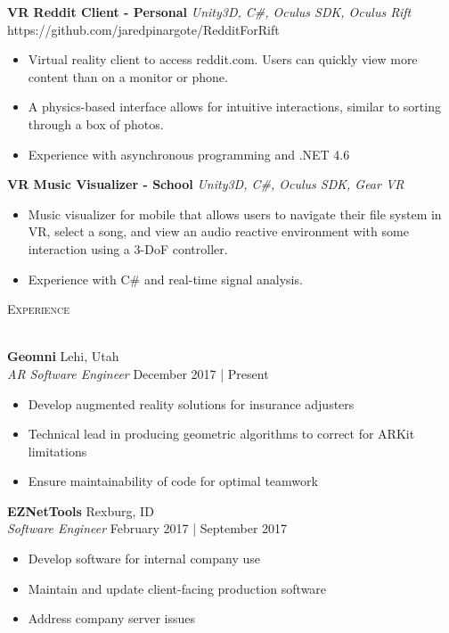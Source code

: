 \documentclass[a4paper]{article}
\newcommand{\lineunder} {
    \vspace*{-8pt} \\
    \hspace*{-18pt} \hrulefill \\
}
\newcommand{\header} [1] {
    {\hspace*{-18pt}\vspace*{6pt} \textsc{#1}}
    \vspace*{-6pt} \lineunder
}
\begin{document}
{\textbf{VR Reddit Client - Personal}} {\sl Unity3D, C\#, Oculus SDK, Oculus Rift} \hfill https://github.com/jaredpinargote/RedditForRift\\
\vspace{-3mm}
\begin{itemize} \itemsep 1pt
    \item Virtual reality client to access reddit.com. Users can quickly view more content than on a monitor or phone.
    \item A physics-based interface allows for intuitive interactions, similar to sorting through a box of photos.
    \item Experience with asynchronous programming and .NET 4.6
\end{itemize}

{\textbf{VR Music Visualizer - School}} {\sl Unity3D, C\#, Oculus SDK, Gear VR} \\
\vspace{-3mm}
\begin{itemize} \itemsep 1pt
    \item Music visualizer for mobile that allows users to navigate their file system in VR, select a song, and view an audio reactive environment with some interaction using a 3-DoF controller.
    \item Experience with C\# and real-time signal analysis.
\end{itemize}

\vspace*{2mm}

\header{Experience}
\vspace{1mm}

\textbf{Geomni} \hfill Lehi, Utah\\
\textit{AR Software Engineer} \hfill December 2017 | Present\\
\vspace{-3mm}
\begin{itemize} \itemsep 1pt
    \item Develop augmented reality solutions for insurance adjusters
    \item Technical lead in producing geometric algorithms to correct for ARKit limitations
    \item Ensure maintainability of code for optimal teamwork
\end{itemize}
\textbf{EZNetTools} \hfill Rexburg, ID\\
\textit{Software Engineer} \hfill February 2017 | September 2017\\
\vspace{-3mm}
\begin{itemize} \itemsep 1pt
    \item Develop software for internal company use
    \item Maintain and update client-facing production software
    \item Address company server issues
\end{itemize}
\end{document}
